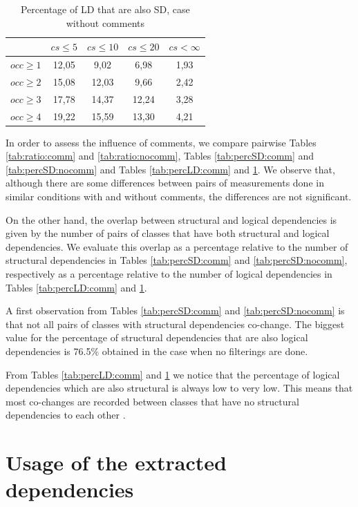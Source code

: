 \documentclass[12pt]{mitthesis}
\begin{document}
\begin{table}[!h]
\renewcommand{\arraystretch}{1}
\caption{Percentage of LD that are also SD, case without comments}
\label{tab:percLD:nocomm}
\centering
\begin{tabular}{|c|c|c|c|c|}
\hline
	      &	$cs\leq 5$	&	$cs\leq 10$	&	$cs\leq 20$	&	$cs< \infty$	\\
\hline
$occ\geq 1$	&	12,05	&	9,02	&	6,98	&	1,93	\\
$occ\geq 2$	&	15,08	&	12,03	&	9,66	&	2,42	\\
$occ\geq 3$	&	17,78	&	14,37	&	12,24	&	3,28	\\
$occ\geq 4$	&	19,22	&	15,59	&	13,30	&	4,21	\\
\hline
\end{tabular}
\end{table}

In order to assess the influence of comments, we compare pairwise Tables \ref{tab:ratio:comm} and \ref{tab:ratio:nocomm},  
Tables \ref{tab:percSD:comm} and \ref{tab:percSD:nocomm} and Tables \ref{tab:percLD:comm} and \ref{tab:percLD:nocomm}. 
We observe that, although there are some differences between pairs of measurements done in similar conditions with and without comments, the differences are not significant.

On the other hand, the overlap between structural and logical dependencies is given by the number of pairs of classes that have both structural and logical dependencies. We evaluate this overlap as a percentage relative to the number of structural dependencies in Tables \ref{tab:percSD:comm} and \ref{tab:percSD:nocomm}, respectively as  a percentage relative to the number of logical dependencies in Tables \ref{tab:percLD:comm} and \ref{tab:percLD:nocomm}.

A first observation from Tables \ref{tab:percSD:comm} and \ref{tab:percSD:nocomm} is that not all pairs of classes with structural dependencies co-change. The biggest value for the percentage of structural dependencies that are also logical dependencies is 76.5\% obtained in the case when no filterings are done.

From Tables \ref{tab:percLD:comm} and \ref{tab:percLD:nocomm} we notice that the percentage of logical dependencies which are also structural is always low to very low. This means that most co-changes are recorded between classes that have no structural dependencies to each other \cite{enase19}.   
 
\chapter{Usage of the extracted dependencies}
\end{document}
